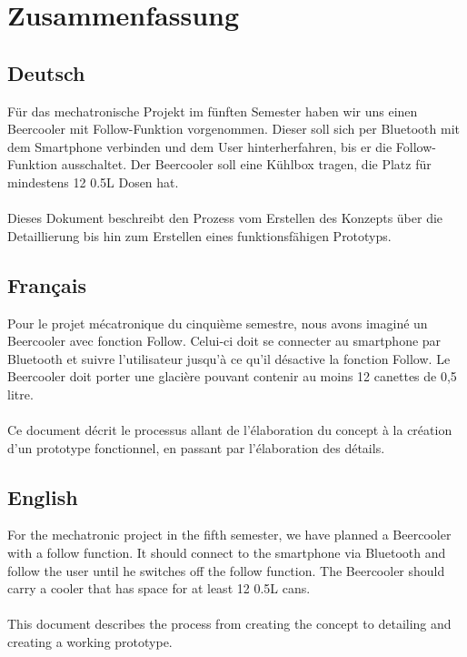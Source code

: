 \section*{Zusammenfassung}

\subsection*{Deutsch}
Für das mechatronische Projekt im fünften Semester haben wir uns einen Beercooler mit Follow-Funktion vorgenommen. Dieser soll sich per Bluetooth mit dem Smartphone verbinden und dem User hinterherfahren, bis er die Follow-Funktion ausschaltet. Der Beercooler soll eine Kühlbox tragen, die Platz für mindestens 12 0.5L Dosen hat. \\
\\
Dieses Dokument beschreibt den Prozess vom Erstellen des Konzepts über die Detaillierung bis hin zum Erstellen eines funktionsfähigen Prototyps.

\subsection*{Français}
Pour le projet mécatronique du cinquième semestre, nous avons imaginé un Beercooler avec fonction Follow. Celui-ci doit se connecter au smartphone par Bluetooth et suivre l'utilisateur jusqu'à ce qu'il désactive la fonction Follow. Le Beercooler doit porter une glacière pouvant contenir au moins 12 canettes de 0,5 litre. \\
\\
Ce document décrit le processus allant de l'élaboration du concept à la création d'un prototype fonctionnel, en passant par l'élaboration des détails.

\subsection*{English}
For the mechatronic project in the fifth semester, we have planned a Beercooler with a follow function. It should connect to the smartphone via Bluetooth and follow the user until he switches off the follow function. The Beercooler should carry a cooler that has space for at least 12 0.5L cans. \\
\\
This document describes the process from creating the concept to detailing and creating a working prototype.

